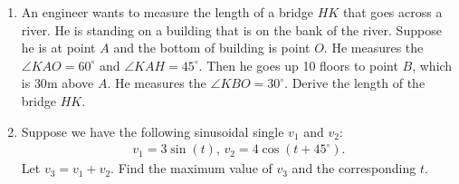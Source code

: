 \documentclass{article}
\begin{document}
\begin{enumerate}
\begin{figure}[h]
  \end{figure}
 
  \newpage
\item An engineer wants to measure the length of a bridge $HK$ that goes across a river. He is standing on a building that is on the bank of the river. Suppose he is at point $A$ and the bottom of building is point $O$. He measures the $\angle KAO = 60^\circ$ and $\angle KAH = 45^\circ$. Then he goes up 10 floors to point $B$, which is $30$m above $A$. He measures the $\angle KBO = 30^\circ$. Derive the length of the bridge $HK$.

   \begin{figure}[h]
    \centering
  \end{figure}
 
\item Suppose we have the following sinusoidal single $v_1$ and $v_2$:
\begin{align*}
  v_1 = 3\sin(t),\,v_2 = 4\cos(t+45^\circ).
\end{align*}
Let $v_3 = v_1 + v_2$. Find the maximum value of $v_3$ and the corresponding $t$.

 
\end{enumerate}
\end{document}
